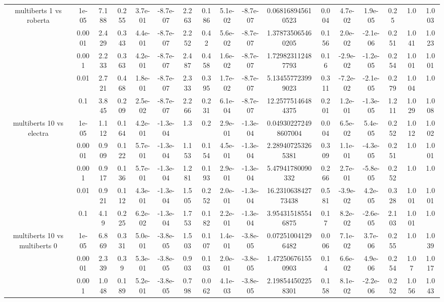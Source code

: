 \begin{tabular}{|c|c|c|c|c|c|c|c|c|c|c|c|c|c|c|c|c|}
\hline
\multirow{5}{*}{multiberts 1 vs roberta } & 1e-05 & 7.188 & 0.255 & 3.7e-01 & -8.7e-07 & 2.263 & 0.186 & 5.1e-02 & -8.7e-07 & 0.068168945610523 & 0.004 & 4.7e-02 & 1.9e-05 & 0.25 & 1.0 & 1.003 \\
 & 0.0001 & 2.429 & 0.343 & 4.4e-01 & -8.7e-07 & 2.252 & 0.42 & 5.6e-02 & -8.7e-07 & 1.378735065460205 & 0.156 & 2.0e-02 & -2.1e-06 & 0.251 & 1.041 & 1.023 \\
 & 0.001 & 2.233 & 0.363 & 4.2e-01 & -8.7e-07 & 2.487 & 0.458 & 1.6e-02 & -8.7e-07 & 1.729823112487793 & 0.16 & -2.9e-02 & -1.2e-05 & 0.254 & 1.001 & 1.001 \\
 & 0.01 & 2.721 & 0.468 & 1.8e-01 & -8.7e-07 & 2.333 & 0.395 & 1.7e-02 & -8.7e-07 & 5.134557723999023 & 0.311 & -7.2e-02 & -2.1e-05 & 0.279 & 1.004 & 1.0 \\
 & 0.1 & 3.845 & 0.209 & 2.5e-02 & -8.7e-07 & 2.266 & 0.231 & 6.1e-04 & -8.7e-07 & 12.25775146484375 & 0.201 & 1.2e-01 & -1.3e-05 & 1.211 & 1.029 & 1.008 \\
\hline
\multirow{5}{*}{multiberts 10 vs electra } & 1e-05 & 1.112 & 0.164 & 4.2e-01 & -1.3e-04 & 1.3 & 0.2 & 2.9e-01 & -1.3e-04 & 0.049302272498607004 & 0.004 & 6.5e-02 & 5.4e-05 & 0.252 & 1.012 & 1.002 \\
 & 0.0001 & 0.909 & 0.122 & 5.7e-01 & -1.3e-04 & 1.153 & 0.154 & 4.5e-01 & -1.3e-04 & 2.289407253265381 & 0.309 & 1.1e-01 & -4.3e-05 & 0.251 & 1.0 & 1.001 \\
 & 0.001 & 0.917 & 0.136 & 5.7e-01 & -1.3e-04 & 1.281 & 0.193 & 2.9e-01 & -1.3e-04 & 5.47941780090332 & 0.266 & 2.7e-01 & -5.8e-05 & 0.252 & 1.0 & 1.0 \\
 & 0.01 & 0.921 & 0.112 & 4.3e-01 & -1.3e-04 & 1.505 & 0.252 & 2.0e-01 & -1.3e-04 & 16.231063842773438 & 0.581 & -3.9e-02 & 4.2e-05 & 0.328 & 1.001 & 1.001 \\
 & 0.1 & 4.19 & 0.225 & 6.2e-02 & -1.3e-04 & 1.753 & 0.182 & 2.2e-01 & -1.3e-04 & 3.954315185546875 & 0.17 & 8.2e-02 & -2.6e-05 & 2.103 & 1.001 & 1.0 \\
\hline
\multirow{5}{*}{multiberts 10 vs multiberts 0} & 1e-05 & 6.869 & 0.331 & 5.0e-01 & -3.8e-05 & 1.503 & 0.107 & 1.4e-01 & -3.8e-05 & 0.072510041296482 & 0.006 & 7.1e-02 & 3.7e-06 & 0.255 & 1.0 & 1.039 \\
 & 0.0001 & 2.339 & 0.39 & 5.3e-01 & -3.8e-05 & 0.903 & 0.103 & 2.0e-01 & -3.8e-05 & 1.472506761550903 & 0.14 & 6.6e-02 & 4.9e-06 & 0.254 & 1.07 & 1.017 \\
 & 0.001 & 1.048 & 0.189 & 5.2e-01 & -3.8e-05 & 0.798 & 0.062 & 4.1e-03 & -3.8e-05 & 2.198544502258301 & 0.158 & 8.1e-02 & -2.2e-06 & 0.252 & 1.056 & 1.043 \\

\end{tabular}
